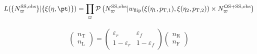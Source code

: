 \documentclass{outhesis}
\begin{document}
\begin{equation}
 L(\{N^\text{SS,obs}_\varpi\}|\{\xi(\eta,\pt)\}) 
= 
 \prod_{\varpi} \mathcal P\left(N^\text{SS,obs}_\varpi|w_\text{flip}(\xi(\eta_1,p_{\mathrm{T},1}),\xi(\eta_2,p_{\mathrm{T},2}))\times N^\text{OS+SS,obs}_\varpi\right)
\label{eqn:chargeflip_likelihood}
\end{equation}


\begin{align}
\begin{pmatrix}n_\text{T}\\n_\text{L}\end{pmatrix} 
= \begin{pmatrix}\varepsilon_r & \varepsilon_f\\ 1-\varepsilon_r & 1-\varepsilon_f\end{pmatrix}
\begin{pmatrix}n_\text{R}\\n_\text{F}\end{pmatrix}
\label{eqn:matrix_method}
\end{align}
\end{document}
